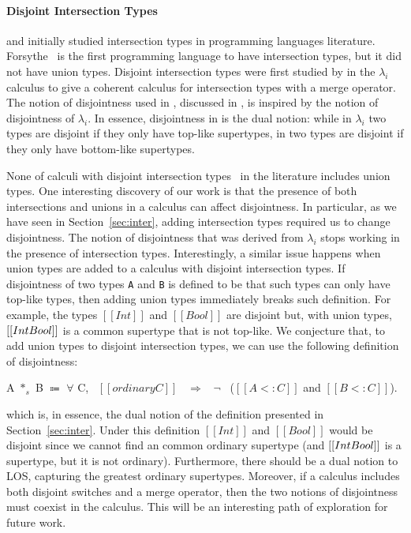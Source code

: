 \paragraph{Disjoint Intersection Types}
\citet{pottinger1980type} and \citet{coppo1981functional} initially
studied intersection types in programming languages
literature. Forsythe~\cite{reynolds1988preliminary} is the first
programming language to have intersection types, but it did not
have union types.  Disjoint intersection types were first
studied by \citet{oliveira2016disjoint} in the $\lambda_{i}$ calculus
to give a coherent calculus for intersection types with a merge
operator. The notion of disjointness used in \cal, discussed in ,
is inspired by the notion of disjointness of $\lambda_{i}$. In essence,
disjointness in \cal is the dual notion: while in $\lambda_{i}$ two types
are disjoint if they only have top-like supertypes, in \cal two types
are disjoint if they only have bottom-like supertypes.

None of calculi with disjoint intersection types~\cite{oliveira2016disjoint,bi_et_al:LIPIcs:2018:9227,alpuimdisjoint} in the literature
includes union types. One interesting discovery of our work is that the
presence of both intersections and unions in a calculus can affect disjointness.
In particular, as we have seen in Section~\ref{sec:inter}, adding intersection types
required us to change disjointness. The notion of disjointness that was
derived from $\lambda_{i}$ stops working in the presence of intersection types.
Interestingly, a similar issue happens when union types are added to
a calculus with disjoint intersection types. If disjointness of two types \lstinline{A}
and \lstinline{B} is defined to be that such types can only have top-like types,
then adding union types immediately breaks such definition.
For example, the types $[[Int]]$ and $[[Bool]]$ are disjoint but, with union
types, $[[Int \/ Bool]]$ is a common supertype that is not top-like.
We conjecture that, to add union types to disjoint intersection types,
we can use the following definition of disjointness:

\begin{definition}
\label{def:related:disj}
  A $*_s$ B $\Coloneqq$ $\forall$ C, \ $[[ordinary C]]$ \ $\Longrightarrow$ \ $\neg$ \ ($[[A <: C]]$ and $[[B <: C]]$).
\end{definition}

\noindent which is, in essence, the dual notion of the definition presented in
Section~\ref{sec:inter}. Under this definition $[[Int]]$ and $[[Bool]]$ would
be disjoint since we cannot find an common ordinary supertype (and $[[Int \/ Bool]]$
is a supertype, but it is not ordinary). Furthermore, there should be a
dual notion to LOS, capturing the greatest ordinary supertypes. Moreover,
if a calculus includes both disjoint switches and a merge operator,
then the two notions of disjointness must coexist in the calculus.
This will be an interesting path of exploration for future work.

